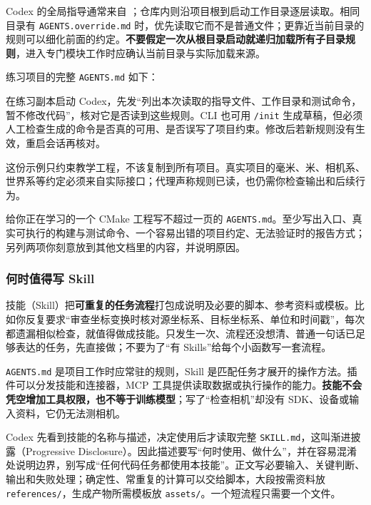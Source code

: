 Codex 的全局指导通常来自 ；仓库内则沿项目根到启动工作目录逐层读取。相同目录有 \texttt{AGENTS.override.md} 时，优先读取它而不是普通文件；更靠近当前目录的规则可以细化前面的约定。\textbf{不要假定一次从根目录启动就递归加载所有子目录规则}，进入专门模块工作时应确认当前目录与实际加载来源。

\begin{example}[给距离换算工程写一份够用的规则]
练习项目的完整 \texttt{AGENTS.md} 如下：

在练习副本启动 Codex，先发“列出本次读取的指导文件、工作目录和测试命令，暂不修改代码”，核对它是否读到这些规则。CLI 也可用 \texttt{/init} 生成草稿，但必须人工检查生成的命令是否真的可用、是否误写了项目约束。修改后若新规则没有生效，重启会话再核对。
\end{example}

这份示例只约束教学工程，不该复制到所有项目。真实项目的毫米、米、相机系、世界系等约定必须来自实际接口；代理声称规则已读，也仍需你检查输出和后续行为。

\begin{exercise}\label{ex:ai-agents}
给你正在学习的一个 CMake 工程写不超过一页的 \texttt{AGENTS.md}。至少写出入口、真实可执行的构建与测试命令、一个容易出错的项目约定、无法验证时的报告方式；另列两项你刻意放到其他文档里的内容，并说明原因。
\end{exercise}

\subsubsection{何时值得写 Skill}
技能（Skill）把\textbf{可重复的任务流程}打包成说明及必要的脚本、参考资料或模板。比如你反复要求“审查坐标变换时核对源坐标系、目标坐标系、单位和时间戳”，每次都遗漏相似检查，就值得做成技能。只发生一次、流程还没想清、普通一句话已足够表达的任务，先直接做；不要为了“有 Skills”给每个小函数写一套流程。

\texttt{AGENTS.md} 是项目工作时应常驻的规则，Skill 是匹配任务才展开的操作方法。插件可以分发技能和连接器，MCP 工具提供读取数据或执行操作的能力。\textbf{技能不会凭空增加工具权限，也不等于训练模型}；写了“检查相机”却没有 SDK、设备或输入资料，它仍无法测相机。

Codex 先看到技能的名称与描述，决定使用后才读取完整 \texttt{SKILL.md}，这叫渐进披露（Progressive Disclosure）。因此描述要写“何时使用、做什么”，并在容易混淆处说明边界，别写成“任何代码任务都使用本技能”。正文写必要输入、关键判断、输出和失败处理；确定性、常重复的计算可以交给脚本，大段按需资料放 \texttt{references/}，生成产物所需模板放 \texttt{assets/}。一个短流程只需要一个文件。

